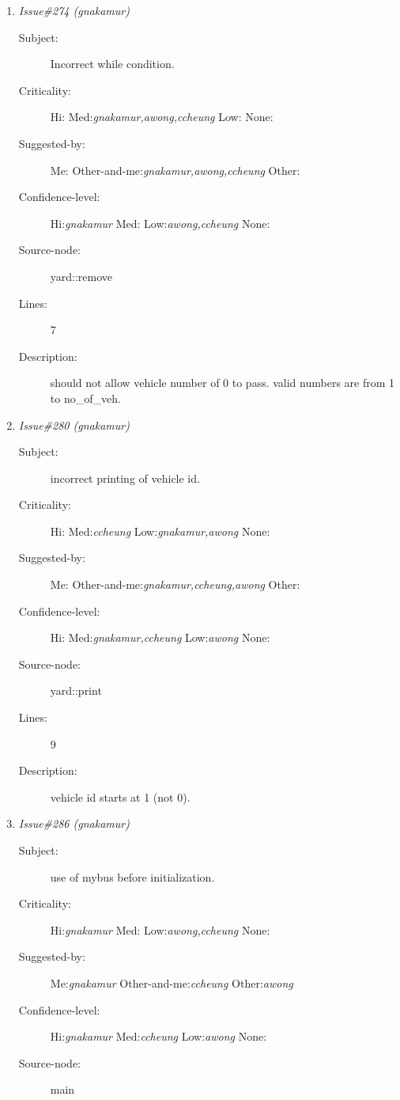 \begin{enumerate}
\begin{description}
\item [Lines:] 5

\item [Description:] All vehicles in the yard are deleted even
though there may only be a few vehicles in it.
\end{description}
\item {\it Issue\#274 (gnakamur)}
\begin{description}
\item [Subject:] Incorrect while condition.
\item [Criticality:] Hi:{\it } Med:{\it gnakamur,awong,ccheung} Low:{\it } None:{\it }
\item [Suggested-by:] Me:{\it } Other-and-me:{\it gnakamur,awong,ccheung} Other:{\it }
\item [Confidence-level:] Hi:{\it gnakamur} Med:{\it } Low:{\it awong,ccheung} None:{\it }
\item [Source-node:] yard::remove

\item [Lines:] 7

\item [Description:] should not allow vehicle number of 0 to pass.
valid numbers are from 1 to no\_of\_veh.
\end{description}
\item {\it Issue\#280 (gnakamur)}
\begin{description}
\item [Subject:] incorrect printing of vehicle id.
\item [Criticality:] Hi:{\it } Med:{\it ccheung} Low:{\it gnakamur,awong} None:{\it }
\item [Suggested-by:] Me:{\it } Other-and-me:{\it gnakamur,ccheung,awong} Other:{\it }
\item [Confidence-level:] Hi:{\it } Med:{\it gnakamur,ccheung} Low:{\it awong} None:{\it }
\item [Source-node:] yard::print

\item [Lines:] 9

\item [Description:] vehicle id starts at 1 (not 0).
\end{description}
\item {\it Issue\#286 (gnakamur)}
\begin{description}
\item [Subject:] use of mybus before initialization.
\item [Criticality:] Hi:{\it gnakamur} Med:{\it } Low:{\it awong,ccheung} None:{\it }
\item [Suggested-by:] Me:{\it gnakamur} Other-and-me:{\it ccheung} Other:{\it awong}
\item [Confidence-level:] Hi:{\it gnakamur} Med:{\it ccheung} Low:{\it awong} None:{\it }
\item [Source-node:] main


\end{description}
\end{enumerate}
